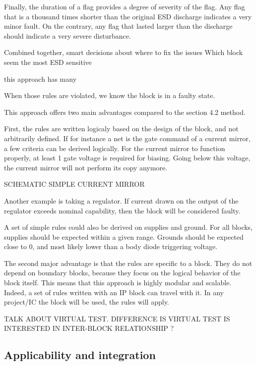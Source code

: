 Finally, the duration of a flag provides a degree of severity of the flag.
Any flag that is a thousand times shorter than the original \gls{ESD} discharge indicates a very minor fault.
On the contrary, any flag that lasted larger than the discharge should indicate a very severe disturbance.

Combined together, smart decisions about where to fix the issues
Which block seem the most ESD sensitive



 this approach has many

When those rules are violated, we know the block is in a faulty state.

This approach offers two main advantages compared to the section 4.2 method.

First, the rules are written logicaly based on the design of the block, and not arbitrarily defined.
If for instance a net is the gate command of a current mirror, a few criteria can be derived logically.
For the current mirror to function properly, at least 1 gate voltage is required for biasing.
Going below this voltage, the current mirror will not perform its copy anymore.

SCHEMATIC SIMPLE CURRENT MIRROR

Another example is taking a regulator.
If current drawn on the output of the regulator exceeds nominal capability, then the block will be considered faulty.

A set of simple rules could also be derived on supplies and ground.
For all blocks, supplies should be expected within a given range.
Grounds should be expected close to 0, and most likely lower than a body diode triggering voltage.

The second major advantage is that the rules are specific to a block.
They do not depend on boundary blocks, because they focus on the logical behavior of the block itself.
This means that this approach is highly modular and scalable.
Indeed, a set of rules written with an IP block can travel with it.
In any project/IC the block will be used, the rules will apply.

TALK ABOUT VIRTUAL TEST. DIFFERENCE IS VIRTUAL TEST IS INTERESTED IN INTER-BLOCK RELATIONSHIP ?


\subsection{Applicability and integration}

